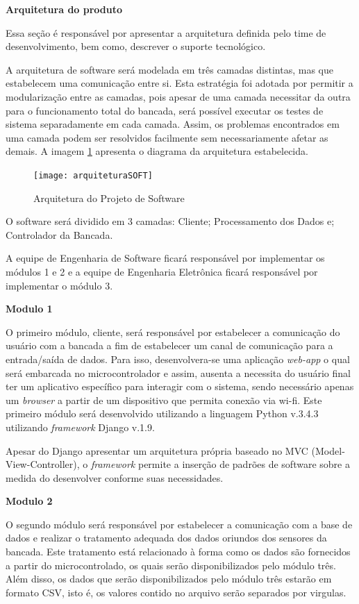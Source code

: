 \textbf{Arquitetura do produto}

	Essa seção é responsável por apresentar a arquitetura definida pelo time de desenvolvimento, bem como, descrever o suporte tecnológico.

	A arquitetura de software será modelada em três camadas distintas, mas que estabelecem uma comunicação entre si. Esta estratégia foi adotada por permitir a modularização entre as camadas, pois apesar de uma camada necessitar da outra para o funcionamento total do bancada, será possível executar os testes de sistema separadamente em cada camada. Assim, os problemas encontrados em uma camada podem ser resolvidos facilmente sem necessariamente afetar as demais. A imagem \ref{arquiteturaSOFT} apresenta o diagrama da arquitetura estabelecida.

	\begin{figure}[h]
		\centering
		\texttt{[image: arquiteturaSOFT]}
		\caption{Arquitetura do Projeto de Software}
		\label{arquiteturaSOFT}
	\end{figure}

	O software será dividido em 3 camadas:
	Cliente;
	Processamento dos Dados e;
	Controlador da Bancada.

	A equipe de Engenharia de Software ficará responsável por implementar os módulos 1 e 2 e a equipe de Engenharia Eletrônica ficará responsável por implementar o módulo 3.

	\textbf{Modulo 1}

	O primeiro módulo, cliente, será responsável por estabelecer a comunicação do usuário com a bancada a fim de estabelecer um canal de comunicação para a entrada/saída de dados. Para isso, desenvolvera-se uma aplicação \textit{web-app} o qual será embarcada no microcontrolador e assim, ausenta a necessita do usuário final ter um aplicativo específico para interagir com o sistema, sendo necessário apenas um \textit{browser} a partir de um dispositivo que permita conexão via wi-fi. Este primeiro módulo será desenvolvido utilizando a linguagem Python v.3.4.3 utilizando \textit{framework} Django v.1.9. 

	Apesar do Django apresentar um arquitetura própria baseado no MVC (Model-View-Controller), o \textit{framework} permite a inserção de padrões de software sobre a medida do desenvolver conforme suas necessidades.

	\textbf{Modulo 2}

	O segundo módulo será responsável por estabelecer a comunicação com a base de dados e realizar o tratamento adequada dos dados oriundos dos sensores da bancada. Este tratamento está relacionado à forma como os dados são fornecidos a partir do microcontrolado, os quais serão disponibilizados pelo módulo três. Além disso, os dados que serão disponibilizados pelo módulo três estarão em formato CSV, isto é, os valores contido no arquivo serão separados por virgulas.


